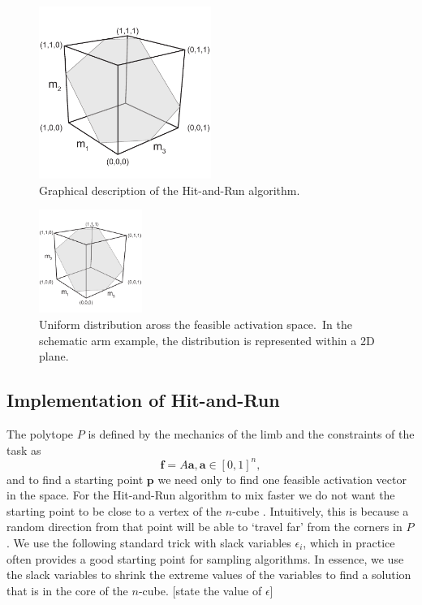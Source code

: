 \begin{figure}[h]
\centering
\includegraphics[width=0.5\textwidth,page=10]{sections/figs/HitandRunSchematics_all.pdf}
\caption{Graphical description of the Hit-and-Run algorithm.}
\label{fig:hitruncube}
\end{figure}

\begin{figure}[h]
\centering
\includegraphics[width=0.3\textwidth,page=9]{sections/figs/HitandRunSchematics_all.pdf}
\caption{Uniform distribution aross the feasible activation space.\ In the schematic arm example, the distribution is represented within a 2D plane.}
\label{fig:posthitrun_distribution}
\end{figure}

\subsection*{Implementation of Hit-and-Run}
The polytope $P$ is defined by the mechanics of the limb and the constraints of the task as
\[\textbf{f} = A\textbf{a}, \textbf{a} \in [0,1]^n,\]
and to find a starting point $\textbf{p}$ we  need only to find one feasible activation vector in the space.
For the Hit-and-Run algorithm to mix faster we do not want the starting point to be close to a vertex of the $n$-cube \cite{Lovasz}. Intuitively, this is because a random direction from that point will be able to `travel far' from the corners in $P$.
We use the following standard trick with slack variables $\epsilon_i$, which in practice often provides a good starting point for sampling algorithms. In essence, we use the slack variables to shrink the extreme values of the variables to find a solution that is in the core of the $n$-cube. [state the value of $\epsilon$]

